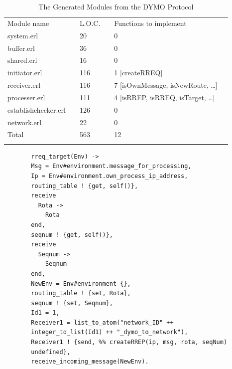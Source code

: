\begin{table}
\vspace*{1em}
\begin{center}
\begin{tabular}{llllll}
    Module name  	& & L.O.C.	& & Functions to implement \\  \noalign{\smallskip}\hline\noalign{\smallskip}
	system.erl 		& & 20	& & 0 \\	
	buffer.erl 		& & 36  & & 0 \\
	shared.erl 		& & 16 	& & 0 \\
	initiator.erl 	& & 116	& & 1 [createRREQ] \\
	receiver.erl  	& & 116 & & 7 [isOwnMessage, isNewRoute, \dots] \\
	processer.erl 	& & 111 & & 4 [isRREP, isRREQ, isTarget, \dots] \\
	establishchecker.erl & & 126  & & 0 \\
	network.erl 	& & 22	& & 0 \\	
	   
	\noalign{\smallskip}\hline\noalign{\smallskip}
	Total & & 563 & & 12
	\\ \noalign{\smallskip}\hline\noalign{\smallskip}
\end{tabular}
\vspace*{1em}
\end{center}   
\caption{The Generated Modules from the DYMO Protocol}
\label{table:gencodestat}
\end{table} 

\begin{figure}[b!]
\begin{verbatim}
  rreq_target(Env) -> 
  Msg = Env#environment.message_for_processing,
  Ip = Env#environment.own_process_ip_address,
  routing_table ! {get, self()},
  receive 
    Rota -> 
      Rota
  end,
  seqnum ! {get, self()},
  receive 
    Seqnum -> 
      Seqnum
  end,
  NewEnv = Env#environment {},
  routing_table ! {set, Rota},
  seqnum ! {set, Seqnum},
  Id1 = 1,
  Receiver1 = list_to_atom("network_ID" ++
  integer_to_list(Id1) ++ "_dymo_to_network"),
  Receiver1 ! {send, %% createRREP(ip, msg, rota, seqNum)
  undefined},
  receive_incoming_message(NewEnv).
\end{verbatim}
\end{figure}

